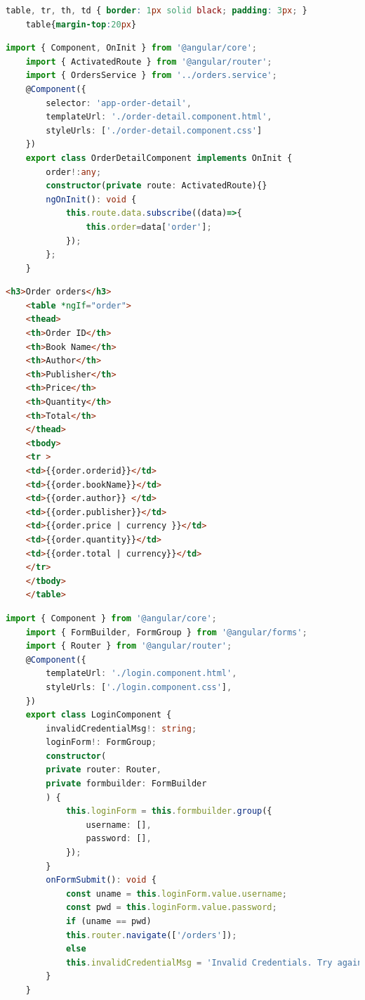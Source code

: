 \documentclass{report}
\begin{document}
\begin{lstlisting}[caption=orders.component.css, language=CSS]
	table, tr, th, td { border: 1px solid black; padding: 3px; }
	table{margin-top:20px}
\end{lstlisting}


\begin{lstlisting}[caption=order-detail.component.ts, language=Typescript]
	import { Component, OnInit } from '@angular/core';
	import { ActivatedRoute } from '@angular/router';
	import { OrdersService } from '../orders.service';
	@Component({
		selector: 'app-order-detail',
		templateUrl: './order-detail.component.html',
		styleUrls: ['./order-detail.component.css']
	})
	export class OrderDetailComponent implements OnInit {
		order!:any;
		constructor(private route: ActivatedRoute){}
		ngOnInit(): void {
			this.route.data.subscribe((data)=>{
				this.order=data['order'];
			});
		};
	}
\end{lstlisting}


\begin{lstlisting}[caption=order-detail.component.html, language=HTML]
	<h3>Order orders</h3>
	<table *ngIf="order">
	<thead>
	<th>Order ID</th>
	<th>Book Name</th>
	<th>Author</th>
	<th>Publisher</th>
	<th>Price</th>
	<th>Quantity</th>
	<th>Total</th>
	</thead>
	<tbody>
	<tr >
	<td>{{order.orderid}}</td>
	<td>{{order.bookName}}</td>
	<td>{{order.author}} </td>
	<td>{{order.publisher}}</td>
	<td>{{order.price | currency }}</td>
	<td>{{order.quantity}}</td>
	<td>{{order.total | currency}}</td>
	</tr>
	</tbody>
	</table>
\end{lstlisting}


\begin{lstlisting}[caption=login.component.ts, language=Typescript]
	import { Component } from '@angular/core';
	import { FormBuilder, FormGroup } from '@angular/forms';
	import { Router } from '@angular/router';
	@Component({
		templateUrl: './login.component.html',
		styleUrls: ['./login.component.css'],
	})
	export class LoginComponent {
		invalidCredentialMsg!: string;
		loginForm!: FormGroup;
		constructor(
		private router: Router,
		private formbuilder: FormBuilder
		) {
			this.loginForm = this.formbuilder.group({
				username: [],
				password: [],
			});
		}
		onFormSubmit(): void {
			const uname = this.loginForm.value.username;
			const pwd = this.loginForm.value.password;
			if (uname == pwd)
			this.router.navigate(['/orders']);
			else
			this.invalidCredentialMsg = 'Invalid Credentials. Try again.';
		}
	}
\end{lstlisting}
\end{document}
